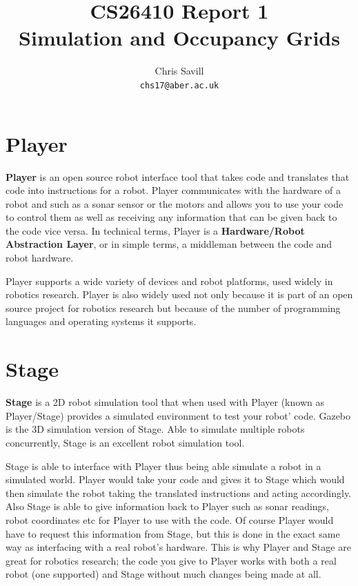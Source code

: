 \documentclass[a4paper,12pt]{article}
\title{CS26410 Report 1\\
Simulation and Occupancy Grids}
\author{Chris Savill\\\texttt{chs17@aber.ac.uk}}
\begin{document}
\maketitle
\newpage
\tableofcontents
\newpage

\section{Player}
\noindent \textbf{Player} is an open source robot interface tool that takes code and translates that code into instructions for a robot. Player communicates with the hardware of a robot and such as a sonar sensor or the motors and allows you to use your code to control them as well as receiving any information that can be given back to the code vice versa. In technical terms, Player is a \textbf{Hardware/Robot Abstraction Layer}, or in simple terms, a middleman between the code and robot hardware.

\vspace{5mm}
\noindent Player supports a wide variety of devices and robot platforms, used widely in robotics research. Player is also widely used not only because it is part of an open source project for robotics research but because of the number of programming languages and operating systems it supports.

\section{Stage}
\textbf{Stage} is a 2D robot simulation tool that when used with Player (known as Player/Stage) provides a simulated environment to test your robot' code. Gazebo is the 3D simulation version of Stage. Able to simulate multiple robots concurrently, Stage is an excellent robot simulation tool.

\vspace{5mm}
\noindent Stage is able to interface with Player thus being able simulate a robot in a simulated world. Player would take your code and gives it to Stage which would then simulate the robot taking the translated instructions and acting accordingly. Also Stage is able to give information back to Player such as sonar readings, robot coordinates etc for Player to use with the code. Of course Player would have to request this information from Stage, but this is done in the exact same way as interfacing with a real robot's hardware. This is why Player and Stage are great for robotics research; the code you give to Player works with both a real robot (one supported) and Stage without much changes being made at all.
\end{document}
